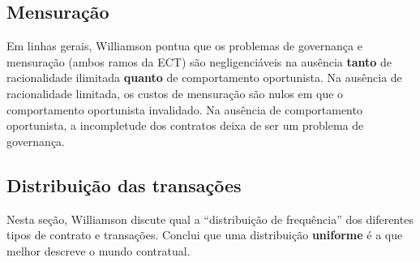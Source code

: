 \subsection*{Mensuração}

Em linhas gerais, Williamson pontua que os problemas de governança e mensuração (ambos ramos da ECT) são negligenciáveis na ausência \textbf{tanto} de racionalidade ilimitada \textbf{quanto} de comportamento oportunista. Na ausência de racionalidade limitada, os custos de mensuração são nulos em que o comportamento oportunista invalidado. Na ausência de comportamento oportunista, a incompletude dos contratos deixa de ser um problema de governança.


\subsection*{Distribuição das transações}

Nesta seção, Williamson discute qual a ``distribuição de frequência'' dos diferentes tipos de contrato e transações. Conclui que uma distribuição \textbf{uniforme} é a que melhor descreve o mundo contratual.